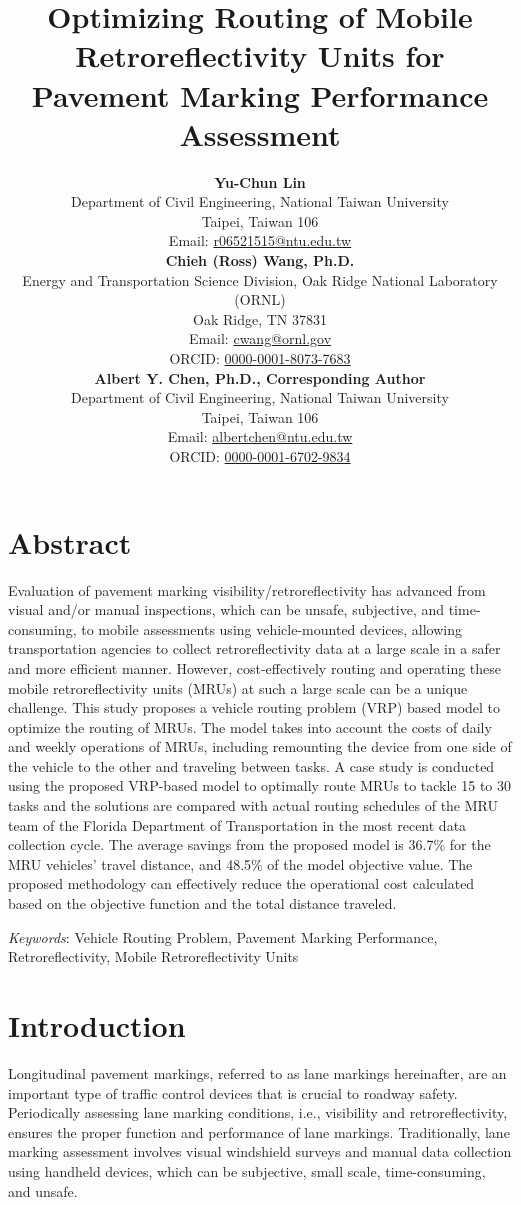 \documentclass[numbered]{trbunofficial}
\title{Optimizing Routing of Mobile Retroreflectivity Units for Pavement Marking Performance Assessment}
\author{%
  \textbf{Yu-Chun Lin}\\
  Department of Civil Engineering, National Taiwan University\\
  Taipei, Taiwan 106\\
  Email: \href{r06521515@ntu.edu.tw}{r06521515@ntu.edu.tw}\\
  \hfill\break%
  \textbf{Chieh (Ross) Wang, Ph.D.}\\
  Energy and Transportation Science Division, Oak Ridge National Laboratory (ORNL)\\
  Oak Ridge, TN 37831\\
  Email: \href{mailto:cwang@ornl.gov}{cwang@ornl.gov}\\
  ORCID: \href{https://orcid.org/0000-0001-8073-7683}{0000-0001-8073-7683}\\
  \hfill\break%
  \textbf{Albert Y. Chen, Ph.D., Corresponding Author}\\
  Department of Civil Engineering, National Taiwan University\\
  Taipei, Taiwan 106\\
  Email: \href{albertchen@ntu.edu.tw}{albertchen@ntu.edu.tw}\\
  ORCID: \href{https://orcid.org/0000-0001-6702-9834}{0000-0001-6702-9834}\\
}
\begin{document}
\maketitle

\section{Abstract}
Evaluation of pavement marking visibility/retroreflectivity has advanced from visual and/or manual inspections, which can be unsafe, subjective, and time-consuming, to mobile assessments using vehicle-mounted devices, allowing transportation agencies to collect retroreflectivity data at a large scale in a safer and more efficient manner. However, cost-effectively routing and operating these mobile retroreflectivity units (MRUs) at such a large scale can be a unique challenge. This study proposes a vehicle routing problem (VRP) based model to optimize the routing of MRUs. The model takes into account the costs of daily and weekly operations of MRUs, including remounting the device from one side of the vehicle to the other and traveling between tasks.  A case study is conducted using the proposed VRP-based model to optimally route MRUs to tackle 15 to 30 tasks and the solutions are compared with actual routing schedules of the MRU team of the Florida Department of Transportation in the most recent data collection cycle. The average savings from the proposed model is 36.7\% for the MRU vehicles' travel distance, and 48.5\% of the model objective value. The proposed methodology can effectively reduce the operational cost calculated based on the objective function and the total distance traveled.

\hfill\break%
\noindent\textit{Keywords}: Vehicle Routing Problem, Pavement Marking Performance, Retroreflectivity, Mobile Retroreflectivity Units
\newpage

\section{Introduction}
Longitudinal pavement markings, referred to as lane markings hereinafter, are an important type of traffic control devices that is crucial to roadway safety. Periodically assessing lane marking conditions, i.e., visibility and retroreflectivity, ensures the proper function and performance of lane markings. Traditionally, lane marking assessment involves visual windshield surveys and manual data collection using handheld devices, which can be subjective, small scale, time-consuming, and unsafe. 
\end{document}
